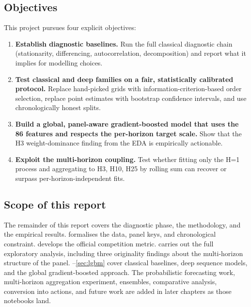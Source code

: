 \subsection{Objectives}
\label{sec:intro:objectives}

This project pursues four explicit objectives:

\begin{enumerate}
  \item \textbf{Establish diagnostic baselines.} Run the full classical diagnostic chain (stationarity, differencing, autocorrelation, decomposition) and report what it implies for modelling choices.
  \item \textbf{Test classical and deep families on a fair, statistically calibrated protocol.} Replace hand-picked grids with information-criterion-based order selection, replace point estimates with bootstrap confidence intervals, and use chronologically honest splits.
  \item \textbf{Build a global, panel-aware gradient-boosted model that uses the 86 features and respects the per-horizon target scale.} Show that the H3 weight-dominance finding from the EDA is empirically actionable.
  \item \textbf{Exploit the multi-horizon coupling.} Test whether fitting only the H=1 process and aggregating to H3, H10, H25 by rolling sum can recover or surpass per-horizon-independent fits.
\end{enumerate}

\subsection{Scope of this report}
\label{sec:intro:scope}

The remainder of this report covers the diagnostic phase, the methodology, and the empirical results.  formalises the data, panel keys, and chronological constraint.  develops the official competition metric.  carries out the full exploratory analysis, including three originality findings about the multi-horizon structure of the panel. --\cref{sec:lgbm} cover classical baselines, deep sequence models, and the global gradient-boosted approach. The probabilistic forecasting work, multi-horizon aggregation experiment, ensembles, comparative analysis, conversion into actions, and future work are added in later chapters as those notebooks land.

